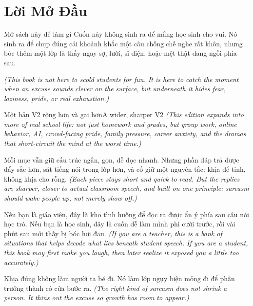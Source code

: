 \chapter*{Lời Mở Đầu}

\begin{quotecard}{Mở sách này để làm gì}
Cuốn này không sinh ra để mắng học sinh cho vui. Nó sinh ra để chụp đúng cái khoảnh khắc một câu chống chế nghe rất khôn, nhưng bóc thêm một lớp là thấy ngay sợ, lười, sĩ diện, hoặc mệt thật đang ngồi phía sau.

\textit{(This book is not here to scold students for fun. It is here to catch the moment when an excuse sounds clever on the surface, but underneath it hides fear, laziness, pride, or real exhaustion.)}
\end{quotecard}

\begin{truyen}{Một bản V2 rộng hơn và gai hơn}{A wider, sharper V2}
\textit{(This edition expands into more of real school life: not just homework and grades, but group work, online behavior, AI, crowd-facing pride, family pressure, career anxiety, and the dramas that short-circuit the mind at the worst time.)}

Mỗi mục vẫn giữ cấu trúc ngắn, gọn, dễ đọc nhanh. Nhưng phần đáp trả được đẩy sắc hơn, sát tiếng nói trong lớp hơn, và cố giữ một nguyên tắc: khịa để tỉnh, không khịa cho rỗng.
\textit{(Each piece stays short and quick to read. But the replies are sharper, closer to actual classroom speech, and built on one principle: sarcasm should wake people up, not merely show off.)}

Nếu bạn là giáo viên, đây là kho tình huống để đọc ra được ẩn ý phía sau câu nói học trò. Nếu bạn là học sinh, đây là cuốn dễ làm mình phì cười trước, rồi vài phút sau mới thấy bị bóc hơi đau.
\textit{(If you are a teacher, this is a bank of situations that helps decode what lies beneath student speech. If you are a student, this book may first make you laugh, then later realize it exposed you a little too accurately.)}
\end{truyen}

\begin{baihoc}
Khịa đúng không làm người ta bé đi. Nó làm lớp ngụy biện mỏng đi để phần trưởng thành có cửa bước ra.
\textit{(The right kind of sarcasm does not shrink a person. It thins out the excuse so growth has room to appear.)}
\end{baihoc}

